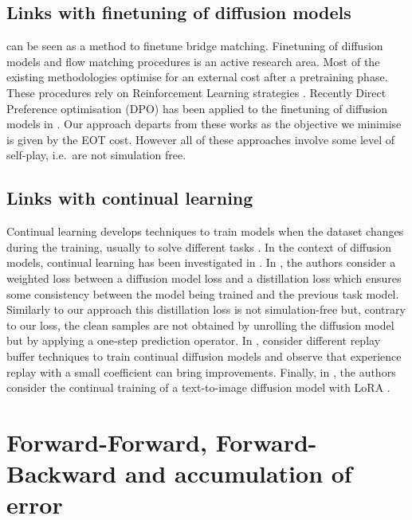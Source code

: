 \documentclass{article}
\begin{document}
\subsection{Links with finetuning of diffusion models}
  can be seen as a method to finetune bridge matching. Finetuning of diffusion models and flow matching procedures is an active research area. Most of the existing methodologies optimise for an external cost after a pretraining phase. These procedures rely on Reinforcement Learning strategies \citep{lee2023aligning,black2023training,fan2024reinforcement}. Recently Direct Preference optimisation (DPO) \citep{rafailov2024direct} has been applied to the finetuning of diffusion models in \citep{yang2023using,rafailov2024direct}. Our approach departs from these works as the objective we minimise is given by the EOT cost. However all of these approaches involve some level of self-play, i.e.~are not simulation free.
 
 \subsection{Links with continual learning}
 \label{sec:continual_learning_appendix}
 
 Continual learning develops techniques to train models when the dataset changes during the training, usually to solve different tasks \cite{de2021continual,parisi2019continual,zajkac2023exploring}. In the context of diffusion models, continual learning has been investigated in \cite{masip2023continual,zajkac2023exploring,smith2023continual}. In \citep{masip2023continual}, the authors consider a weighted loss between a diffusion model loss and a distillation loss which ensures some consistency between the model being trained and the previous task model. Similarly to our approach this distillation loss is not simulation-free but, contrary to our loss, the clean samples are not obtained by unrolling the diffusion model but by applying a one-step prediction operator. In \citep{zajkac2023exploring}, consider different replay buffer techniques to train continual diffusion models and observe that experience replay with a small coefficient can bring improvements. Finally, in \citep{smith2023continual}, the authors consider the continual training of a text-to-image diffusion model with LoRA \citep{hu2021lora}. 

\section{Forward-Forward, Forward-Backward and accumulation of error}
\label{sec:forward_forward_forward_backward}
\end{document}
